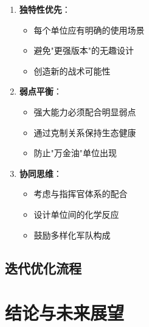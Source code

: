 \documentclass[a4paper,12pt]{article}
\begin{document}
\begin{enumerate}
\item \textbf{独特性优先}：
   \begin{itemize}
   \item 每个单位应有明确的使用场景
   \item 避免"更强版本"的无趣设计
   \item 创造新的战术可能性
   \end{itemize}

\item \textbf{弱点平衡}：
   \begin{itemize}
   \item 强大能力必须配合明显弱点
   \item 通过克制关系保持生态健康
   \item 防止"万金油"单位出现
   \end{itemize}

\item \textbf{协同思维}：
   \begin{itemize}
   \item 考虑与指挥官体系的配合
   \item 设计单位间的化学反应
   \item 鼓励多样化军队构成
   \end{itemize}
\end{enumerate}

\subsection{迭代优化流程}

\begin{center}
\end{center}

\section{结论与未来展望}
\end{document}

